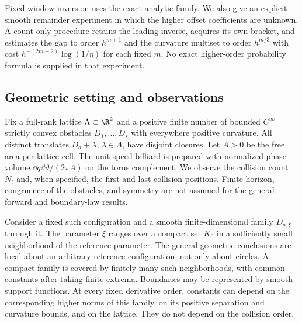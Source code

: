 Fixed-window inversion uses the exact analytic family. We also give an
explicit smooth remainder experiment in which the higher offset
coefficients are unknown. A count-only procedure retains the leading
inverse, acquires its own bracket, and estimates the gap to order
$h^{m+1}$ and the curvature multiset to order $h^{m/3}$ with cost
$h^{-(2m+2)}\log(1/\eta)$ for each fixed $m$. No exact higher-order
probability formula is supplied in that experiment.
\subsection{Geometric setting and observations}
Fix a full-rank lattice $\Lambda\subset\R^2$ and a positive finite number of bounded
$C^\infty$ strictly convex obstacles $D_1,\ldots,D_s$ with everywhere
positive curvature. All distinct translates $D_a+\lambda$, $\lambda\in
\Lambda$, have disjoint closures. Let $A>0$ be the free area per lattice
cell. The unit-speed billiard is prepared with normalized phase volume
$\dd q\dd\vartheta/(2\pi A)$ on the torus complement. We observe the
collision count $N_t$ and, when specified, the first and last collision
positions. Finite horizon, congruence of the obstacles, and symmetry
are not assumed for the general forward and boundary-law results.

Consider a fixed such configuration and a smooth finite-dimensional
family $D_{a,\xi}$ through it. The parameter $\xi$ ranges over a compact
set $K_0$ in a sufficiently small neighborhood of the reference parameter.
The general geometric conclusions are local about an arbitrary reference configuration,
not only about circles. A compact family is covered by finitely many
such neighborhoods, with common constants after taking finite extrema.
Boundaries may be represented by smooth support functions. At every
fixed derivative order, constants can depend on the corresponding
higher norms of this family, on its positive separation and curvature
bounds, and on the lattice. They do not depend on the collision order.

